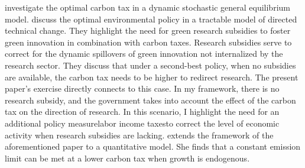  \cite{Golosov2014OptimalEquilibrium} investigate the optimal carbon tax in a dynamic stochastic general equilibrium model.  
\cite{Acemoglu2012TheChange} discuss the optimal environmental policy in a tractable model of directed technical change.
They highlight the need for green research subsidies to foster green innovation in combination with carbon taxes. Research subsidies serve to correct for the dynamic spillovers of green innovation not internalized by the research sector. They discuss that under a second-best policy, when no subsidies are available, the carbon tax needs to be higher to redirect research. The present paper's exercise 
directly connects to this case. In my framework, there is no research subsidy, and the government takes into account the effect of the carbon tax on the direction of research. In this scenario, I highlight the need for an additional policy measure\textemdash labor income taxes\textemdash to correct the level of economic activity when research subsidies are lacking. 
\cite{Fried2018ClimateAnalysis} extends the framework of the aforementioned paper to a quantitative model. %
She finds that a constant emission limit can be met at a lower carbon tax when growth is endogenous. %




